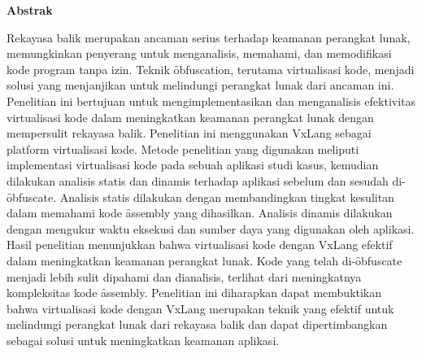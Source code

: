 \begin{center}
    \fontsize{12}{14.4}\selectfont\textbf{Abstrak} %
\end{center}
\fontsize{10}{12}\selectfont %
Rekayasa balik merupakan ancaman serius terhadap keamanan perangkat lunak, memungkinkan penyerang untuk menganalisis, memahami, dan memodifikasi kode program tanpa izin. Teknik \f{obfuscation}, terutama virtualisasi kode, menjadi solusi yang menjanjikan untuk melindungi perangkat lunak dari ancaman ini. Penelitian ini bertujuan untuk mengimplementasikan dan menganalisis efektivitas virtualisasi kode dalam meningkatkan keamanan perangkat lunak dengan mempersulit rekayasa balik. Penelitian ini menggunakan VxLang sebagai platform virtualisasi kode. Metode penelitian yang digunakan meliputi implementasi virtualisasi kode pada sebuah aplikasi studi kasus, kemudian dilakukan analisis statis dan dinamis terhadap aplikasi sebelum dan sesudah di-\f{obfuscate}. Analisis statis dilakukan dengan membandingkan tingkat kesulitan dalam memahami kode \f{assembly} yang dihasilkan. Analisis dinamis dilakukan dengan mengukur waktu eksekusi dan sumber daya yang digunakan oleh aplikasi. Hasil penelitian menunjukkan bahwa virtualisasi kode dengan VxLang efektif dalam meningkatkan keamanan perangkat lunak. Kode yang telah di-\f{obfuscate} menjadi lebih sulit dipahami dan dianalisis, terlihat dari meningkatnya kompleksitas kode \f{assembly}. Penelitian ini diharapkan dapat membuktikan bahwa virtualisasi kode dengan VxLang merupakan teknik yang efektif untuk melindungi perangkat lunak dari rekayasa balik dan dapat dipertimbangkan sebagai solusi untuk meningkatkan keamanan aplikasi.
\vspace{0.5cm}
